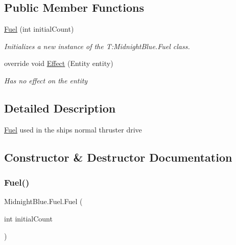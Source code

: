 \subsection*{Public Member Functions}
\begin{DoxyCompactItemize}
\item 
\hyperlink{class_midnight_blue_1_1_fuel_a44747305c7b7d4572d23fd764e568fc1}{Fuel} (int initial\+Count)
\begin{DoxyCompactList}\small\item\em Initializes a new instance of the T\+:\+Midnight\+Blue.\+Fuel class. \end{DoxyCompactList}\item 
override void \hyperlink{class_midnight_blue_1_1_fuel_a9ab52c79211ec8cdcc9389f772615ac0}{Effect} (Entity entity)
\begin{DoxyCompactList}\small\item\em Has no effect on the entity \end{DoxyCompactList}\end{DoxyCompactItemize}


\subsection{Detailed Description}
\hyperlink{class_midnight_blue_1_1_fuel}{Fuel} used in the ships normal thruster drive 



\subsection{Constructor \& Destructor Documentation}
\hypertarget{class_midnight_blue_1_1_fuel_a44747305c7b7d4572d23fd764e568fc1}{}\label{class_midnight_blue_1_1_fuel_a44747305c7b7d4572d23fd764e568fc1} 
\subsubsection{\texorpdfstring{Fuel()}{Fuel()}}
{\footnotesize\ttfamily Midnight\+Blue.\+Fuel.\+Fuel (\begin{DoxyParamCaption}\item[{int}]{initial\+Count }\end{DoxyParamCaption})\hspace{0.3cm}{\ttfamily [inline]}}



